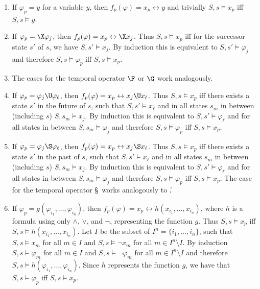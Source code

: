     \begin{enumerate}[$\bullet$]
    \item
      If $\varphi_p=y$ for a variable $y$, then $f_p(\varphi) = x_p \leftrightarrow y$ and trivially $S, s \vDash x_p$
      iff $S, s \vDash y$.
    \item
      If $\varphi_p=\X\varphi_j$, then $f_p(\varphi) = x_p \leftrightarrow \X x_j$. Thus $S,s \vDash x_p$ iff for the
      successor state $s'$ of $s$, we have $S,s' \vDash x_j$. By induction this is equivalent to $S,s' \vDash \varphi_j$ and
      therefore $S,s \vDash \varphi_p$ iff $S,s \vDash x_p$.
    \item
      The cases for the temporal operator $\F$ or $\G$ work analogously.
    \item
      If $\varphi_p = \varphi_j \U \varphi_\ell$, then $f_p(\varphi) = x_p \leftrightarrow x_j \U x_\ell$. Thus $S,s \vDash x_p$
      iff there exists a state $s'$ in the future of $s$, such that $S,s' \vDash x_\ell$ and in all states $s_m$ in between
      (including $s$) $S,s_m \vDash x_j$. By induction this is equivalent to $S,s' \vDash \varphi_\ell$ and for all states
      in between $S,s_m \vDash \varphi_j$ and therefore $S,s \vDash \varphi_p$ iff $S,s \vDash x_p$.
    \item  \ifreport
      If $\varphi_p = \varphi_j \S \varphi_\ell$, then $f_p(\varphi) = x_p \leftrightarrow x_j \S x_\ell$. Thus $S,s \vDash x_p$
      iff there exists a state $s'$ in the past of $s$, such that $S,s' \vDash x_\ell$ and in all states $s_m$ in between
      (including $s$) $S,s_m \vDash x_j$. By induction this is equivalent to $S,s' \vDash \varphi_\ell$ and for all states
      in between $S,s_m \vDash \varphi_j$ and therefore $S,s \vDash \varphi_p$ iff $S,s \vDash x_p$.
     \else The case for the temporal operator \S\ works analogously to \U. \fi
    \item
      If $\varphi_p=g(\varphi_{i_1},\dots, \varphi_{i_n})$, then $f_p(\varphi) = x_p \leftrightarrow h(x_{i_1},\dots,x_{i_n})$,
      where $h$ is a formula using only $\wedge$, $\vee$, and $\neg$, representing the function $g$. Thus
      $S,s \vDash x_p$ iff $S,s \vDash h(x_{i_1},\dots,x_{i_n})$. Let $I$ be the subset of $I^n=\{i_1,\dots,i_n\}$, such that
      $S,s \vDash x_m$ for all $m \in I$ and $S,s \vDash \neg x_m$ for all $m \in I^n \setminus I$.
      By induction $S,s \vDash \varphi_m$ for all $m \in I$ and $S,s \vDash \neg \varphi_m$ for all
      $m \in I^n \setminus I$ and therefore $S,s \vDash h(\varphi_{i_1},\dots,\varphi_{i_n})$. Since
      $h$ represents the function $g$, we have that $S,s \vDash \varphi_p$ iff $S,s \vDash x_p$.
    \end{enumerate}


